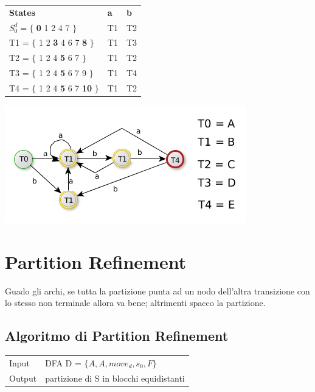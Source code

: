 \begin{tabular}{lll}
    \textbf{States}                                 &   \textbf{a}        &     \textbf{b} \\
    $S_0^d = \{$ \textbf{0} 1 2 4 7 $\}$            &   T1                &     T2 \\
    T1 = $\{$ 1 2 \textbf{3} 4 6 7 \textbf{8} $\}$  &   T1                &     T3 \\
    T2 = $\{$ 1 2 4 \textbf{5} 6 7 $\}$             &   T1                &     T2 \\
    T3 = $\{$ 1 2 4 \textbf{5} 6 7 9 $\}$           &   T1                &     T4 \\
    T4 = $\{$ 1 2 4 \textbf{5} 6 7 \textbf{10} $\}$ &   T1                &     T2 \\
\end{tabular}

\begin{center}
	\includegraphics[scale=0.5]{Chapters/Img/c02_04.png}\\
\end{center} 

\section{Partition Refinement}
\begin{tcolorbox}\begin{center}
    Guado gli archi, se tutta la partizione punta ad un nodo dell'altra transizione con lo stesso non terminale allora va bene; 
    altrimenti spacco la partizione.
\end{center}\end{tcolorbox}

\subsection{Algoritmo di Partition Refinement}
\begin{center}
    \begin{tabular}{ll}
        Input   &   DFA D = $\{ A,A,move_d, s_0, F\}$\\
        Output  &   partizione di S in blocchi equidistanti\\ 
    \end{tabular}
\end{center}

